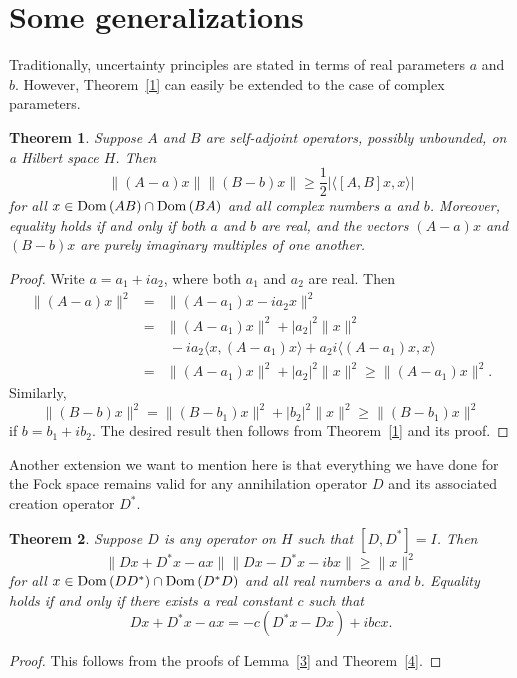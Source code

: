 \documentclass[12pt,reqno]{amsart}
\newtheorem{thm}{Theorem}
\begin{document}
\section{Some generalizations}

Traditionally, uncertainty principles are stated in terms of real parameters $a$ and $b$. However, Theorem~\ref{1}
can easily be extended to the case of complex parameters.

\begin{thm}
Suppose $A$ and $B$ are self-adjoint operators, possibly unbounded, on a Hilbert space $H$. Then
$$\|(A-a)x\|\|(B-b)x\|\ge\frac12|\langle[A,B]x,x\rangle|$$
for all $x\in{{\rm Dom}\,}(AB)\cap{{\rm Dom}\,}(BA)$ and all complex numbers $a$ and $b$. Moreover, equality holds if and only 
if both $a$ and $b$ are real, and the vectors $(A-a)x$ and $(B-b)x$ are purely imaginary multiples of one another.
\end{thm}

\begin{proof}
Write $a=a_1+ia_2$, where both $a_1$ and $a_2$ are real. Then
\begin{eqnarray*}
\|(A-a)x\|^2&=&\|(A-a_1)x-ia_2x\|^2\\
&=&\|(A-a_1)x\|^2+|a_2|^2\|x\|^2\\
&&\ -ia_2\langle x,(A-a_1)x\rangle+a_2i\langle(A-a_1)x,x\rangle\\
&=&\|(A-a_1)x\|^2+|a_2|^2\|x\|^2\ge\|(A-a_1)x\|^2.
\end{eqnarray*}
Similarly,
$$\|(B-b)x\|^2=\|(B-b_1)x\|^2+|b_2|^2\|x\|^2\ge\|(B-b_1)x\|^2$$
if $b=b_1+ib_2$. The desired result then follows from Theorem~\ref{1} and its proof.
\end{proof}

Another extension we want to mention here is that everything we have done for the Fock space remains
valid for any annihilation operator $D$ and its associated creation operator $D^*$.

\begin{thm}
Suppose $D$ is any operator on $H$ such that $[D,D^*]=I$. Then
$$\|Dx+D^*x-ax\|\|Dx-D^*x-ibx\|\ge\|x\|^2$$
for all $x\in{{\rm Dom}\,}(DD^*)\cap{{\rm Dom}\,}(D^*D)$ and all real numbers $a$ and $b$. Equality holds if and only if 
there exists a real constant $c$ such that
$$Dx+D^*x-ax=-c(D^*x-Dx)+ibcx.$$
\end{thm}

\begin{proof}
This follows from the proofs of Lemma~\ref{3} and Theorem~\ref{4}.
\end{proof}
\end{document}
